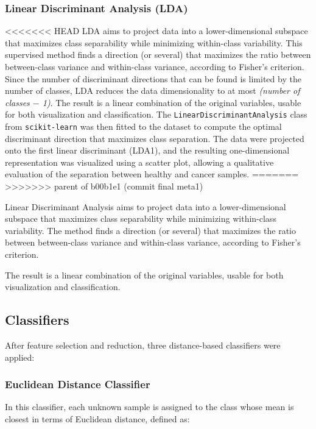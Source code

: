 \documentclass[a4paper,12pt]{article}
\begin{document}
\subsubsection{Linear Discriminant Analysis (LDA)}
<<<<<<< HEAD
\noindent
LDA aims to project data into a lower-dimensional subspace that maximizes class separability while minimizing within-class variability.  
This supervised method finds a direction (or several) that maximizes the ratio between between-class variance and within-class variance, according to Fisher's criterion.
\noindent
Since the number of discriminant directions that can be found is limited by the number of classes, LDA reduces the data dimensionality to at most \textit{(number of classes $-$ 1)}.
\noindent
The result is a linear combination of the original variables, usable for both visualization and classification.
\noindent
The \texttt{LinearDiscriminantAnalysis} class from \texttt{scikit-learn} was then fitted to the dataset to compute the optimal discriminant direction that maximizes class separation.
\noindent
The data were projected onto the first linear discriminant (LDA1), and the resulting one-dimensional representation was visualized using a scatter plot, allowing a qualitative evaluation of the separation between healthy and cancer samples.
=======
>>>>>>> parent of b00b1e1 (commit final meta1)

Linear Discriminant Analysis aims to project data into a lower-dimensional subspace that maximizes class separability while minimizing within-class variability.  
The method finds a direction (or several) that maximizes the ratio between between-class variance and within-class variance, according to Fisher's criterion.

The result is a linear combination of the original variables, usable for both visualization and classification.

\subsection{Classifiers}

After feature selection and reduction, three distance-based classifiers were applied:

\subsubsection{Euclidean Distance Classifier}

In this classifier, each unknown sample is assigned to the class whose mean is closest in terms of Euclidean distance, defined as:
\end{document}
